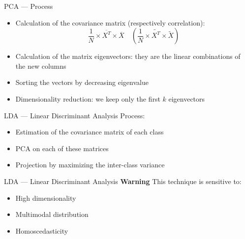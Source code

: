 \begin{frame}{PCA --- Process}
  \begin{itemize}
    \item Calculation of the covariance matrix (respectively correlation):
      \[
      \frac{1}{N} \times \overline{X^T} \times \overline{X}
      \quad
      ( \frac{1}{N} \times \widetilde{X^T} \times \widetilde{X} )
      \]
    \item Calculation of the matrix eigenvectors: they are the linear combinations of the new columns
    \item Sorting the vectors by decreasing eigenvalue
    \item Dimensionality reduction: we keep only the first $k$ eigenvectors
  \end{itemize}

\end{frame}

\begin{frame}{LDA --- Linear Discriminant Analysis}
  Process:

  \begin{itemize}
    \item Estimation of the covariance matrix of each class
    \item PCA on each of these matrices
    \item Projection by maximizing the inter-class variance
  \end{itemize}
\end{frame}

\begin{frame}{LDA --- Linear Discriminant Analysis}
  \textbf{Warning} This technique is sensitive to:

  \begin{itemize}
    \item High dimensionality
    \item Multimodal distribution
    \item Homoscedasticity
  \end{itemize}
\end{frame}
